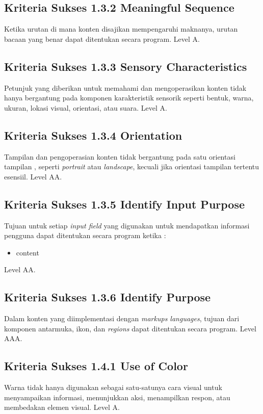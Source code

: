 \subsection{Kriteria Sukses 1.3.2 Meaningful Sequence}
\label{sec:kriteria_1.3.2}
Ketika urutan di mana konten disajikan mempengaruhi maknanya, urutan bacaan yang benar dapat ditentukan secara program.
Level A.

\subsection{Kriteria Sukses 1.3.3 Sensory Characteristics}
\label{sec:kriteria_1.3.3}
Petunjuk yang diberikan untuk memahami dan mengoperasikan konten tidak hanya bergantung pada komponen karakteristik sensorik seperti bentuk, warna, ukuran, lokasi visual, orientasi, atau suara.
Level A.

\subsection{Kriteria Sukses 1.3.4 Orientation}
\label{sec:kriteria_1.3.4}
Tampilan dan pengoperasian konten tidak bergantung pada satu orientasi tampilan , seperti \textit{portrait} atau \textit{landscape}, kecuali jika orientasi tampilan tertentu esensiil.
Level AA.

\subsection{Kriteria Sukses 1.3.5 Identify Input Purpose}
\label{sec:kriteria_1.3.5}
Tujuan untuk setiap \textit{input field} yang digunakan untuk mendapatkan informasi pengguna dapat ditentukan secara program ketika :

\begin{itemize}
	\item content
\end{itemize}
Level AA.

\subsection{Kriteria Sukses 1.3.6 Identify Purpose}
\label{sec:kriteria_1.3.6}
Dalam konten yang diimplementasi dengan \textit{markups languages}, tujuan dari komponen antarmuka, ikon, dan \textit{regions} dapat ditentukan secara program.
Level AAA.

\subsection{Kriteria Sukses 1.4.1 Use of Color}
\label{sec:kriteria_1.4.1}
Warna tidak hanya digunakan sebagai satu-satunya cara visual untuk menyampaikan informasi, menunjukkan aksi, menampilkan respon, atau membedakan elemen visual.
Level A.


